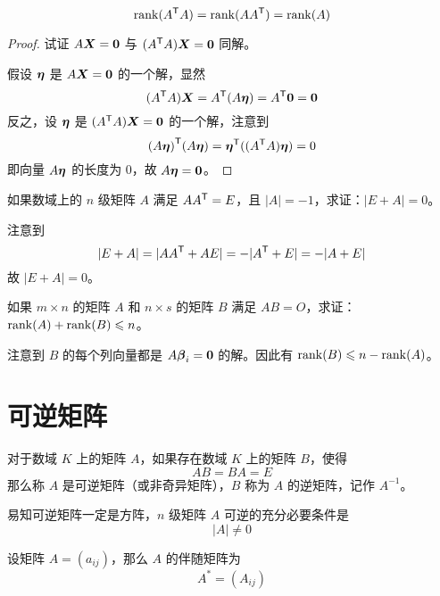 \begin{theorem}
	\[ \operatorname{rank}({A}^\mathsf{T}A) = \operatorname{rank}(A {A}^\mathsf{T}) = \operatorname{rank}(A) \]
\end{theorem}

\begin{proof}
	试证 $A\boldsymbol{X} = \boldsymbol{0}$ 与 $({A}^\mathsf{T}A) \boldsymbol{X} = \boldsymbol{0}$ 同解。
	
	假设 $\boldsymbol{\eta}$ 是 $A \boldsymbol{X} = \boldsymbol{0}$ 的一个解，显然
	\[ ({A}^\mathsf{T}A) \boldsymbol{X} = {A}^\mathsf{T} (A \boldsymbol{\eta}) = {A}^\mathsf{T} \boldsymbol{0} = \boldsymbol{0} \]
	反之，设 $\boldsymbol{\eta}$ 是 $({A}^\mathsf{T}A) \boldsymbol{X} = \boldsymbol{0}$ 的一个解，注意到
	\[ {(A \boldsymbol{\eta})}^\mathsf{T}(A \boldsymbol{\eta}) = {\boldsymbol{\eta}}^\mathsf{T} (({A}^\mathsf{T}A) \boldsymbol{\eta}) = 0 \]
	即向量 $A \boldsymbol{\eta}$ 的长度为 $0$，故 $A \boldsymbol{\eta} = \boldsymbol{0}$。
\end{proof}

\begin{example}
	如果数域上的 $n$ 级矩阵 $A$ 满足 $A {A}^\mathsf{T} = E$，且 $|A| = -1$，求证：$|E+A| = 0$。
\end{example}

\begin{solution}
	注意到
	\[ |E+A| = |A{A}^\mathsf{T} + AE| = -|{A}^\mathsf{T} + E| = -|A+E| \]
	故 $|E+A| = 0$。
\end{solution}

\begin{example}
	如果 $m \times n$ 的矩阵 $A$ 和 $n \times s$ 的矩阵 $B$ 满足 $AB = O$，求证：$\operatorname{rank}(A) + \operatorname{rank}(B) \leqslant n$。
\end{example}

\begin{solution}
	注意到 $B$ 的每个列向量都是 $A \boldsymbol{\beta}_i = \boldsymbol{0}$ 的解。因此有 $\operatorname{rank}(B) \leqslant n - \operatorname{rank}(A)$。
\end{solution}

\section{可逆矩阵}

\begin{definition}
	对于数域 $K$ 上的矩阵 $A$，如果存在数域 $K$ 上的矩阵 $B$，使得
	\[AB = BA = E\]
	那么称 $A$ 是可逆矩阵（或非奇异矩阵），$B$ 称为 $A$ 的逆矩阵，记作 $A^{-1}$。
\end{definition}

易知可逆矩阵一定是方阵，$n$ 级矩阵 $A$ 可逆的充分必要条件是
\[|A| \ne 0\]

\begin{definition}
	设矩阵 $A = (a_{ij})$，那么 $A$ 的伴随矩阵为
	\[A^*=(A_{ij})\]
\end{definition}

